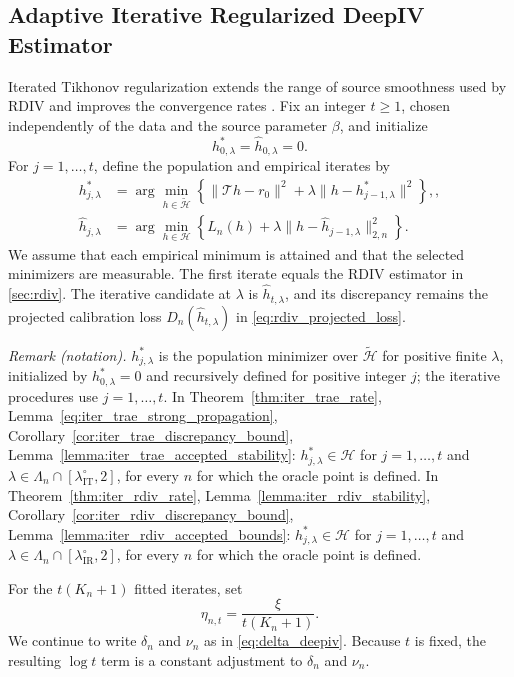 \documentclass[12pt]{article}
\theoremstyle{plain}
\theoremstyle{definition}
\theoremstyle{remark}
\begin{document}
\subsection{Adaptive Iterative Regularized DeepIV Estimator}

Iterated Tikhonov regularization extends the range of source smoothness used by RDIV and improves the convergence rates \citep{li2024regularized}. Fix an integer $t\geqslant1$, chosen independently of the data and the source parameter $\beta$, and initialize
\[
h_{0,\lambda}^*=\hat h_{0,\lambda}=0.
\]
For $j=1,\ldots,t$, define the population and empirical iterates by
\begin{align}
h_{j,\lambda}^*
&=\arg\min_{h\in\widetilde{\mathcal H}}
\left\{\|\mathcal T h-r_0\|^2+\lambda\|h-h_{j-1,\lambda}^*\|^2\right\},
\label{eq:iter_population}, \\ \hat h_{j,\lambda}
&=\arg\min_{h\in\mathcal H}
\left\{L_n(h)+\lambda\|h-\hat h_{j-1,\lambda}\|_{2,n}^2\right\}.
\label{eq:iter_rdiv_estimator}
\end{align}
We assume that each empirical minimum is attained and that the selected minimizers are measurable. The first iterate equals the RDIV estimator in \cref{sec:rdiv}. The iterative candidate at $\lambda$ is $\hat h_{t,\lambda}$, and its discrepancy remains the projected calibration loss $D_n(\hat h_{t,\lambda})$ in \eqref{eq:rdiv_projected_loss}.

\noindent\textit{Remark (notation).} $h_{j,\lambda}^*$ is the population minimizer over $\tilde{\mathcal H}$ for positive finite $\lambda$, initialized by $h_{0,\lambda}^*=0$ and recursively defined for positive integer $j$; the iterative procedures use $j=1,\ldots,t$. In Theorem~\ref{thm:iter_trae_rate}, Lemma~\ref{eq:iter_trae_strong_propagation}, Corollary~\ref{cor:iter_trae_discrepancy_bound}, Lemma~\ref{lemma:iter_trae_accepted_stability}: $h_{j,\lambda}^*\in\mathcal H$ for $j=1,\ldots,t$ and $\lambda\in\Lambda_n\cap[\lambda_{\mathrm{IT}}^\circ,2]$, for every $n$ for which the oracle point is defined. In Theorem~\ref{thm:iter_rdiv_rate}, Lemma~\ref{lemma:iter_rdiv_stability}, Corollary~\ref{cor:iter_rdiv_discrepancy_bound}, Lemma~\ref{lemma:iter_rdiv_accepted_bounds}: $h_{j,\lambda}^*\in\mathcal H$ for $j=1,\ldots,t$ and $\lambda\in\Lambda_n\cap[\lambda_{\mathrm{IR}}^\circ,2]$, for every $n$ for which the oracle point is defined.


For the $t(K_n+1)$ fitted iterates, set
\[
\eta_{n,t}=\frac{\xi}{t(K_n+1)} .
\]
We continue to write $\delta_n$ and $\nu_n$ as in \eqref{eq:delta_deepiv}. Because $t$ is fixed, the resulting $\log t$ term is a constant adjustment to $\delta_n$ and $\nu_n$.
\end{document}
